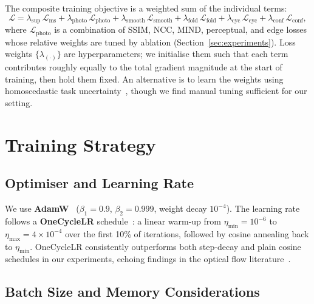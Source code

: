 The composite training objective is a weighted sum of the individual terms:
%
\begin{equation}
  \mathcal{L}
  = \lambda_{\text{sup}}\,\mathcal{L}_{\text{ms}}
  + \lambda_{\text{photo}}\,\mathcal{L}_{\text{photo}}
  + \lambda_{\text{smooth}}\,\mathcal{L}_{\text{smooth}}
  + \lambda_{\text{fold}}\,\mathcal{L}_{\text{fold}}
  + \lambda_{\text{cyc}}\,\mathcal{L}_{\text{cyc}}
  + \lambda_{\text{conf}}\,\mathcal{L}_{\text{conf}},
  \label{eq:total}
\end{equation}
%
where $\mathcal{L}_{\text{photo}}$ is a combination of SSIM, NCC, MIND,
perceptual, and edge losses whose relative weights are tuned by ablation
(Section~\ref{sec:experiments}).  Loss weights
$\{\lambda_{(\cdot)}\}$ are hyperparameters; we initialise them such that each
term contributes roughly equally to the total gradient magnitude at the start
of training, then hold them fixed.  An alternative is to learn the weights
using homoscedastic task uncertainty~\cite{kendall2018multitask}, though we
find manual tuning sufficient for our setting.


\section{Training Strategy}
\label{sec:training}

\subsection{Optimiser and Learning Rate}
\label{ssec:optimiser}

We use \textbf{AdamW}~\cite{loshchilov2019adamw} ($\beta_1=0.9$,
$\beta_2=0.999$, weight decay $10^{-4}$).  The learning rate follows a
\textbf{OneCycleLR} schedule~\cite{smith2019onecycle}: a linear warm-up from
$\eta_{\min}=10^{-6}$ to $\eta_{\max}=4\times10^{-4}$ over the first 10\%
of iterations, followed by cosine annealing back to $\eta_{\min}$.  OneCycleLR
consistently outperforms both step-decay and plain cosine schedules in our
experiments, echoing findings in the optical flow
literature~\cite{teed2020raft}.

\subsection{Batch Size and Memory Considerations}
\label{ssec:batchsize}


